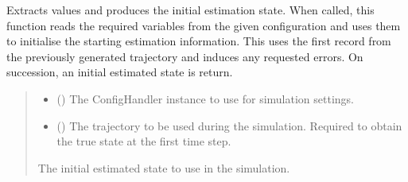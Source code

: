 \documentclass[letterpaper,10pt,english]{sphinxmanual}
\begin{document}
\begin{fulllineitems}
\label{\detokenize{modules/input/config:qnav.input.config.get_estimation}}
\pysigstartsignatures
{}
\pysigstopsignatures
\sphinxAtStartPar
Extracts values and produces the initial estimation state.
When called, this function reads the required variables from the
given configuration and uses them to initialise the starting
estimation information. This uses the first record from the
previously generated trajectory and induces any requested errors.
On succession, an initial estimated state is return.
\begin{quote}\begin{description}
\begin{itemize}
\item {} 
\sphinxAtStartPar
{} ({\hyperref[\detokenize{modules/input/config_handler:qnav.input.config_handler.ConfigHandler}]{}}) \textendash{} The ConfigHandler instance to use for simulation settings.

\item {} 
\sphinxAtStartPar
{} ({\hyperref[\detokenize{modules/waypoints/trajectory:qnav.waypoints.trajectory.Trajectory}]{}}) \textendash{} The trajectory to be used during the simulation.
Required to obtain the true state at the first time step.

\end{itemize}

\sphinxAtStartPar
The initial estimated state to use in the simulation.

\sphinxAtStartPar
{\hyperref[\detokenize{modules/estimation/state:qnav.estimation.state.EstimatedState}]{}}

\end{description}\end{quote}

\end{fulllineitems}
\end{document}
